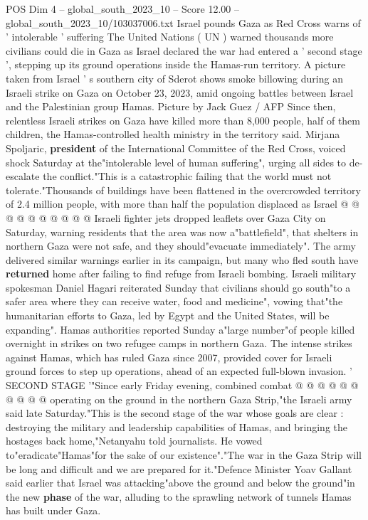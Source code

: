 \begin{textsample}{POS Dim 4 – global\_south\_2023\_10 – Score 12.00 – global\_south\_2023\_10/103037006.txt}  \label{ex:f4_pos_425}
Israel pounds Gaza as Red Cross warns of ' intolerable ' suffering The United Nations ( UN ) warned thousands more civilians could die in Gaza as Israel declared the war had entered a ' second stage ', stepping up its ground operations inside the Hamas-run territory.
A picture taken from Israel ' s southern city of Sderot shows smoke billowing during an Israeli strike on Gaza on October 23, 2023, amid ongoing battles between Israel and the Palestinian group Hamas.
Picture by Jack Guez / AFP Since then, relentless Israeli strikes on Gaza have killed more than 8,000 people, half of them children, the Hamas-controlled health ministry in the territory said.
Mirjana Spoljaric, \textbf{president} of the International Committee of the Red Cross, voiced shock Saturday at the"intolerable level of human suffering", urging all sides to de-escalate the conflict."This is a catastrophic failing that the world must not tolerate."Thousands of buildings have been flattened in the overcrowded territory of 2.4 million people, with more than half the population displaced as Israel @ @ @ @ @ @ @ @ @ @ Israeli fighter jets dropped leaflets over Gaza City on Saturday, warning residents that the area was now a"battlefield", that shelters in northern Gaza were not safe, and they should"evacuate immediately".
The army delivered similar warnings earlier in its campaign, but many who fled south have \textbf{returned} home after failing to find refuge from Israeli bombing.
Israeli military spokesman Daniel Hagari reiterated Sunday that civilians should go south"to a safer area where they can receive water, food and medicine", vowing that"the humanitarian efforts to Gaza, led by Egypt and the United States, will be expanding".
Hamas authorities reported Sunday a"large number"of people killed overnight in strikes on two refugee camps in northern Gaza.
The intense strikes against Hamas, which has ruled Gaza since 2007, provided cover for Israeli ground forces to step up operations, ahead of an expected full-blown invasion. ' SECOND STAGE '"Since early Friday evening, combined combat @ @ @ @ @ @ @ @ @ @ operating on the ground in the northern Gaza Strip,"the Israeli army said late Saturday."This is the second stage of the war whose goals are clear : destroying the military and leadership capabilities of Hamas, and bringing the hostages back home,"Netanyahu told journalists.
He vowed to"eradicate"Hamas"for the sake of our existence"."The war in the Gaza Strip will be long and difficult and we are prepared for it."Defence Minister Yoav Gallant said earlier that Israel was attacking"above the ground and below the ground"in the new \textbf{phase} of the war, alluding to the sprawling network of tunnels Hamas has built under Gaza.

\end{textsample}
